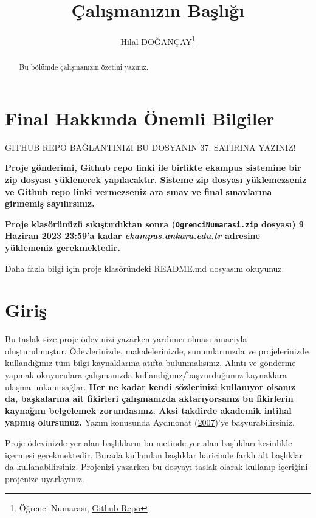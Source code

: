 \documentclass[
  12pt,
]{article}
\title{Çalışmanızın Başlığı}
\author{Hilal DOĞANÇAY\footnote{Öğrenci Numarası, \href{https://github.com/KULLANICI_ADINIZ/REPO_ADINIZ}{Github Repo}}}
\date{}
\begin{document}
\maketitle
\begin{abstract}
Bu bölümde çalışmanızın özetini yazınız.
\end{abstract}

\hypertarget{final-hakkux131nda-uxf6nemli-bilgiler}{%
\section{Final Hakkında Önemli Bilgiler}\label{final-hakkux131nda-uxf6nemli-bilgiler}}

\colorbox{BurntOrange}{GITHUB REPO BAĞLANTINIZI BU DOSYANIN 37. SATIRINA YAZINIZ!}

\textbf{Proje gönderimi, Github repo linki ile birlikte ekampus sistemine bir zip dosyası yüklenerek yapılacaktır. Sisteme zip dosyası yüklemezseniz ve Github repo linki vermezseniz ara sınav ve final sınavlarına girmemiş sayılırsınız.}

\textbf{Proje klasörünüzü sıkıştırdıktan sonra (\texttt{OgrenciNumarasi.zip} dosyası) 9 Haziran 2023 23:59'a kadar \emph{ekampus.ankara.edu.tr} adresine yüklemeniz gerekmektedir.}

\colorbox{WildStrawberry}{Daha fazla bilgi için proje klasöründeki README.md dosyasını okuyunuz.}

\hypertarget{giriux15f}{%
\section{Giriş}\label{giriux15f}}

Bu taslak size proje ödevinizi yazarken yardımcı olması amacıyla oluşturulmuştur. Ödevlerinizde, makalelerinizde, sunumlarınızda ve projelerinizde kullandığınız tüm bilgi kaynaklarına atıfta bulunmalısınız. Alıntı ve gönderme yapmak okuyuculara çalışmanızda kullandığınız/başvurduğunuz kaynaklara ulaşma imkanı sağlar. \textbf{Her ne kadar kendi sözlerinizi kullanıyor olsanız da, başkalarına ait fikirleri çalışmanızda aktarıyorsanız bu fikirlerin kaynağını belgelemek zorundasınız. Aksi takdirde akademik intihal yapmış olursunuz.} Yazım konusunda Aydınonat (\protect\hyperlink{ref-aydinonat:2007}{2007})'ye başvurabilirsiniz.

Proje ödevinizde yer alan başlıkların bu metinde yer alan başlıkları kesinlikle içermesi gerekmektedir. Burada kullanılan başlıklar haricinde farklı alt başlıklar da kullanabilirsiniz. Projenizi yazarken bu dosyayı taslak olarak kullanıp içeriğini projenize uyarlayınız.
\end{document}
